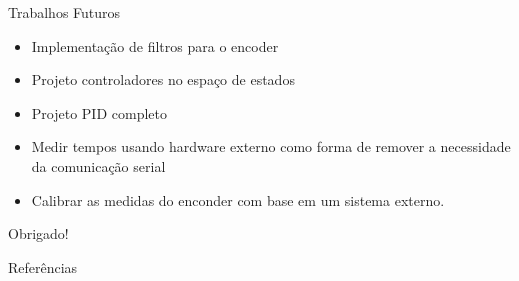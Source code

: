 \documentclass{beamer}
\begin{document}
\begin{frame}{Trabalhos Futuros}
\begin{itemize}
    \item Implementação de filtros para o encoder
    \item Projeto controladores no espaço de estados
    \item Projeto PID completo
    \item Medir tempos usando hardware externo como forma de remover a necessidade da comunicação serial
    \item Calibrar as medidas do enconder com base em um sistema externo.
\end{itemize}
\end{frame}

\begin{frame}{}
\centering
\Huge{Obrigado!}
\end{frame}

\nocite{nise2012}

\begin{frame}{Referências}
\end{frame}
\end{document}
